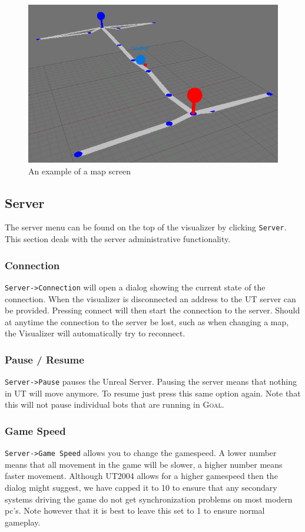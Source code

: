 \documentclass[11pt,a4paper]{article}
\newcommand{\Goal}{\textsc{Goal}}
\begin{document}
\begin{figure}[h!]
\centering
\includegraphics[width=1.0\textwidth]{images/map.png}
\caption{An example of a map screen}\label{fig:map}
\end{figure}


\subsection{Server}
The server menu can be found on the top of the visualizer by clicking \texttt{Server}. This section deals with the server administrative functionality.

\subsubsection*{Connection}
\texttt{Server->Connection} will open a dialog showing the current state of the connection. When the visualizer is disconnected an address to the UT server can be provided. Pressing connect will then start the connection to the server.  Should at anytime the connection to the server be lost, such as when changing a map, the Visualizer will automatically try to reconnect.

\subsubsection*{Pause / Resume}
\texttt{Server->Pause} pauses the Unreal Server. Pausing the server means that nothing in UT will move anymore. To resume just press this same option again. Note that this will not pause individual bots that are running in \Goal. %

\subsubsection*{Game Speed}
\texttt{Server->Game Speed} allows you to change the gamespeed. A lower number means that all movement in the game will be slower, a higher number means faster movement. Although UT2004 allows for a higher gamespeed then the dialog might suggest, we have capped it to 10 to ensure that any secondary systems driving the game do not get synchronization problems on most modern pc's. Note however that it is best to leave this set to 1 to ensure normal gameplay.
\end{document}
